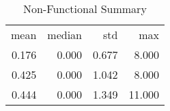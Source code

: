 \begin{table}[ht]
\centering
\caption{Non-Functional Summary} 
\begin{tabular}{rrrr}
 mean & median & std & max \\ 
 0.176 & 0.000 & 0.677 & 8.000 \\ 
   \hline
0.425 & 0.000 & 1.042 & 8.000 \\ 
  0.444 & 0.000 & 1.349 & 11.000 \\ 
  \end{tabular}
\end{table}
